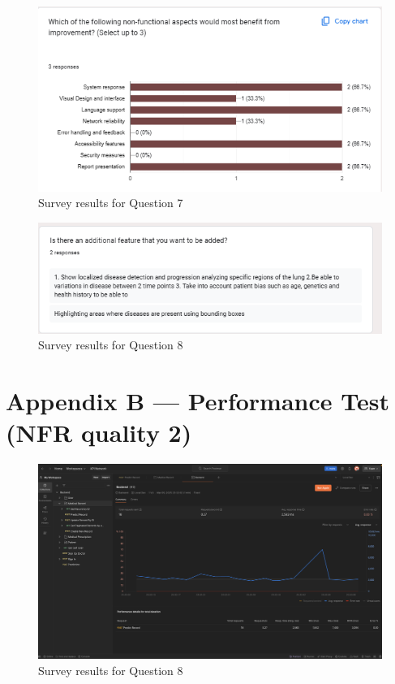 \documentclass[12pt, titlepage]{article}
\begin{document}
  \begin{figure}[ht!]
    \centering
    \includegraphics[scale=1.5]{../assets/s7.png}
    \caption{Survey results for Question 7}
    \label{fig:survey7}
  \end{figure}
  
  \begin{figure}[ht!]
    \centering
    \includegraphics[scale=1.5]{../assets/s8.png}
    \caption{Survey results for Question 8}
    \label{fig:survey8}
  \end{figure}

\clearpage

\section*{Appendix B --- Performance Test (NFR quality 2)}\label{appendix:B}
\begin{figure}[ht!]
  \centering
  \includegraphics[scale=0.24]{../assets/Perf.png}
  \caption{Survey results for Question 8}
  \label{fig:survey8}
\end{figure}
\end{document}
